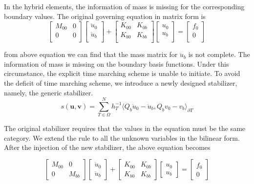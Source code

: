 In the hybrid elements, the information of mass is missing for the corresponding boundary values. The original governing equation in matrix form is
\begin{equation}
\begin{bmatrix}
M_{00} & 0 \\0 & 0 \\
\end{bmatrix}\begin{bmatrix}
\ddot{u}_{0} \\ \ddot{u}_{b} \\
\end{bmatrix} + \begin{bmatrix}
K_{00} & K_{0b} \\ K_{b0} & K_{bb} \\
\end{bmatrix} \begin{bmatrix}
u_{0} \\ u_{b} \\
\end{bmatrix} = \begin{bmatrix}
f_{0} \\ 0 \\
\end{bmatrix}
\end{equation}

from above equation we can find that the mass matrix for $ \ddot{u}_{b} $ is not complete. The information of mass is missing on the boundary basis functions. Under this circumstance, the explicit time marching scheme is unable to initiate. To avoid the deficit of time marching scheme, we introduce a newly designed stabilizer, namely, the generic stabilizer.
\begin{equation}
s(\mathbf{u}, \mathbf{v}) = \sum_{T \in \Omega}^{N} h_{T}^{-1} \langle Q_{b} \ddot{u}_{0} - \ddot{u}_{b}, Q_{b} v_{0} - v_{b} \rangle_{\partial T}
\end{equation}

The original stabilizer requires that the values in the equation must be the same category. We extend the rule to all the unknown variables in the bilinear form. After the injection of the new stabilizer, the above equation becomes

\begin{equation}
\begin{bmatrix}
M_{00} & 0 \\ 0 & M_{bb}
\end{bmatrix}\begin{bmatrix}
\ddot{u}_{0} \\ \ddot{u}_{b}
\end{bmatrix} + \begin{bmatrix}
K_{00} & K_{0b} \\
K_{b0} & K_{bb} 
\end{bmatrix} \begin{bmatrix}
u_{0} \\ u_{b}
\end{bmatrix} = \begin{bmatrix}
f_{0} \\ 0
\end{bmatrix}
\end{equation}

